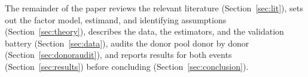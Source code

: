 The remainder of the paper reviews the relevant literature (Section~\ref{sec:lit}),
sets out the factor model, estimand, and identifying assumptions
(Section~\ref{sec:theory}), describes the data, the estimators, and the validation
battery (Section~\ref{sec:data}), audits the donor pool donor by donor
(Section~\ref{sec:donoraudit}), and reports results for both events
(Section~\ref{sec:results}) before concluding (Section~\ref{sec:conclusion}).
